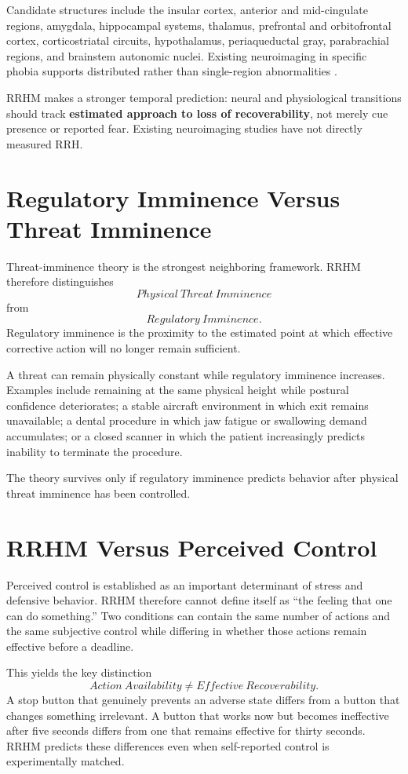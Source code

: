 \documentclass[11pt]{article}
\begin{document}
Candidate structures include the insular cortex, anterior and mid-cingulate regions, amygdala, hippocampal systems, thalamus, prefrontal and orbitofrontal cortex, corticostriatal circuits, hypothalamus, periaqueductal gray, parabrachial regions, and brainstem autonomic nuclei. Existing neuroimaging in specific phobia supports distributed rather than single-region abnormalities \cite{linares2012,etkin2007}.

RRHM makes a stronger temporal prediction: neural and physiological transitions should track \textbf{estimated approach to loss of recoverability}, not merely cue presence or reported fear. Existing neuroimaging studies have not directly measured RRH.

\section{Regulatory Imminence Versus Threat Imminence}

Threat-imminence theory is the strongest neighboring framework. RRHM therefore distinguishes
\[
Physical\ Threat\ Imminence
\]
from
\[
Regulatory\ Imminence.
\]
Regulatory imminence is the proximity to the estimated point at which effective corrective action will no longer remain sufficient.

A threat can remain physically constant while regulatory imminence increases. Examples include remaining at the same physical height while postural confidence deteriorates; a stable aircraft environment in which exit remains unavailable; a dental procedure in which jaw fatigue or swallowing demand accumulates; or a closed scanner in which the patient increasingly predicts inability to terminate the procedure.

The theory survives only if regulatory imminence predicts behavior after physical threat imminence has been controlled.

\section{RRHM Versus Perceived Control}

Perceived control is established as an important determinant of stress and defensive behavior. RRHM therefore cannot define itself as ``the feeling that one can do something.'' Two conditions can contain the same number of actions and the same subjective control while differing in whether those actions remain effective before a deadline.

This yields the key distinction
\[
Action\ Availability\neq Effective\ Recoverability.
\]
A stop button that genuinely prevents an adverse state differs from a button that changes something irrelevant. A button that works now but becomes ineffective after five seconds differs from one that remains effective for thirty seconds. RRHM predicts these differences even when self-reported control is experimentally matched.
\end{document}
